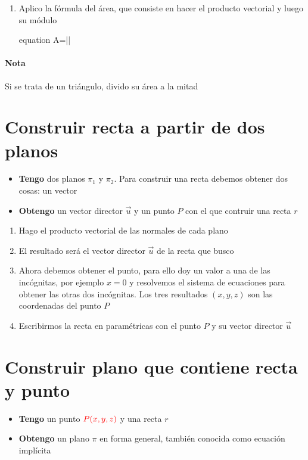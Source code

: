 \begin{enumerate}
\item Aplico la fórmula del área, que consiste en hacer el producto vectorial y luego su módulo
	\begin{empheq}[box=\formulaBox]{equation}
		A=|\times{}|
	\end{empheq}

\end{enumerate}
\paragraph{Nota} Si se trata de un triángulo, divido su área a la mitad

\section{Construir recta a partir de dos planos}
\begin{itemize}
	\item \textbf{Tengo} dos planos $\pi_1$ y $\pi_2$. Para construir una recta debemos obtener dos cosas: un vector
	\item \textbf{Obtengo} un vector director $\vec{u}$ y un punto $P$ con el que contruir una recta $r$
\end{itemize}

\begin{enumerate}
	\item Hago el producto vectorial de las normales de cada plano
	\item El resultado será el vector director $\vec{u}$ de la recta que busco
	\item Ahora debemos obtener el punto, para ello doy un valor a una de las incógnitas, por
		ejemplo $x=0$ y resolvemos el sistema de ecuaciones para obtener las otras dos incógnitas.
		Los tres resultados $(x,y,z)$ son las coordenadas del punto $P$
	\item Escribirmos la recta en paramétricas con el punto $P$ y su vector director $\vec{u}$
\end{enumerate}


\section{Construir plano que contiene recta y punto}
\begin{itemize}
	\item \textbf{Tengo} un punto $\color{red}P(x,y,z)$ y una recta $r$
	\item \textbf{Obtengo} un plano $\pi$ en forma general, también conocida como ecuación implícita
\end{itemize}

